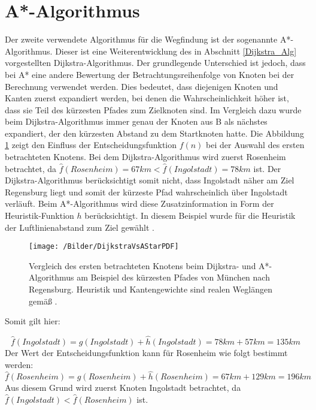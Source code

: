 \section{A*-Algorithmus}
	Der zweite verwendete Algorithmus für die Wegfindung ist der sogenannte A*-Algorithmus. Dieser ist eine Weiterentwicklung des in Abschnitt \ref{Dijkstra_Alg} vorgestellten Dijkstra-Algorithmus. Der grundlegende Unterschied ist jedoch, dass bei A* eine andere Bewertung der Betrachtungsreihenfolge von Knoten bei der Berechnung verwendet werden. Dies bedeutet, dass diejenigen Knoten und Kanten zuerst expandiert werden, bei denen die Wahrscheinlichkeit höher ist, dass sie Teil des kürzesten Pfades zum Zielknoten sind. Im Vergleich dazu wurde beim Dijkstra-Algorithmus immer genau der Knoten aus B als nächstes expandiert, der den kürzesten Abstand zu dem Startknoten hatte. Die Abbildung \ref{DijkstraVsA*} zeigt den Einfluss der Entscheidungsfunktion $f(n)$ bei der Auswahl des ersten betrachteten Knotens. Bei dem Dijkstra-Algorithmus wird zuerst Rosenheim betrachtet, da $\hat{f}(Rosenheim)=67km<\hat{f}(Ingolstadt)=78km$ ist. Der Dijkstra-Algorithmus berücksichtigt somit nicht, dass Ingolstadt näher am Ziel Regensburg liegt und somit der kürzeste Pfad wahrscheinlich über Ingolstadt verläuft. Beim A*-Algorithmus wird diese Zusatzinformation in Form der Heuristik-Funktion $h$ berücksichtigt. In diesem Beispiel wurde für die Heuristik der Luftlinienabstand zum Ziel gewählt \cite{Luftlinie}.
	
	\begin{figure}[h]
		\centering
		\texttt{[image: /Bilder/DijkstraVsAStarPDF]}
		\vspace{0.2cm}
		\caption{Vergleich des ersten betrachteten Knotens beim Dijkstra- und A*-Algorithmus am Beispiel des kürzesten Pfades von München nach Regensburg. Heuristik und Kantengewichte sind realen Weglängen gemäß \cite{Luftlinie}.} \label{DijkstraVsA*}
	\end{figure}
	Somit gilt hier:
	
	\begin{equation}
		\hat{f}(Ingolstadt)=g(Ingolstadt)+\hat{h}(Ingolstadt)=78km+57km=135km
	\end{equation}
	Der Wert der Entscheidungsfunktion kann für Rosenheim wie folgt bestimmt werden:
	\begin{equation}
		\hat{f}(Rosenheim)=g(Rosenheim)+\hat{h}(Rosenheim)=67km+129km=196km
	\end{equation}
	Aus diesem Grund wird zuerst Knoten Ingolstadt betrachtet, da $\hat{f}(Ingolstadt)<\hat{f}(Rosenheim)$ ist.
	
